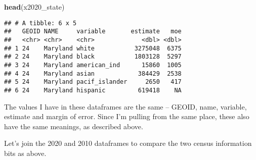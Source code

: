 \documentclass[
]{article}
\newenvironment{Shaded}{\begin{snugshade}}{\end{snugshade}}
\newcommand{\FunctionTok}[1]{\textcolor[rgb]{0.13,0.29,0.53}{\textbf{#1}}}
\newcommand{\NormalTok}[1]{#1}
\begin{document}
\begin{Shaded}
\begin{Highlighting}[]
\FunctionTok{head}\NormalTok{(x2020\_state)}
\end{Highlighting}
\end{Shaded}

\begin{verbatim}
## # A tibble: 6 x 5
##   GEOID NAME     variable       estimate   moe
##   <chr> <chr>    <chr>             <dbl> <dbl>
## 1 24    Maryland white           3275048  6375
## 2 24    Maryland black           1803128  5297
## 3 24    Maryland american_ind      15860  1005
## 4 24    Maryland asian            384429  2538
## 5 24    Maryland pacif_islander     2650   417
## 6 24    Maryland hispanic         619418    NA
\end{verbatim}

The values I have in these dataframes are the same -- GEOID, name,
variable, estimate and margin of error. Since I'm pulling from the same
place, these also have the same meanings, as described above.

Let's join the 2020 and 2010 dataframes to compare the two census
information bits as above.
\end{document}
